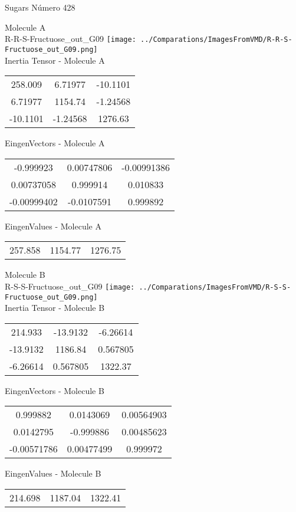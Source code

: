 \vtab[-2cm]
\begin{center}
{\large Sugars \tab Número 428}
\end{center}
\begin{multicols}{2}
\begin{center}

Molecule A \\ 
R-R-S-Fructuose\_out\_G09
\texttt{[image: ../Comparations/ImagesFromVMD/R-R-S-Fructuose\_out\_G09.png]}
\\
Inertia Tensor - Molecule A \\
\vtab

\begin{tabular}{|c c c|}
258.009	 & 	6.71977	 & 	-10.1101	 \\
6.71977	 & 	1154.74	 & 	-1.24568	 \\
-10.1101	 & 	-1.24568	 & 	1276.63
\end{tabular}

\vtab
 EingenVectors - Molecule A     \\
\vtab
\begin{tabular}{|c c c|}
-0.999923	 & 	0.00747806	 & 	-0.00991386	 \\
0.00737058	 & 	0.999914	 & 	0.010833	 \\
-0.00999402	 & 	-0.0107591	 & 	0.999892
\end{tabular}

\vtab
 EingenValues - Molecule A     \\
\vtab
\begin{tabular}{|c c c|}
257.858	 & 	1154.77	 & 	1276.75	 \\
\end{tabular}
\columnbreak

Molecule B \\ 
R-S-S-Fructuose\_out\_G09
\texttt{[image: ../Comparations/ImagesFromVMD/R-S-S-Fructuose\_out\_G09.png]}
\\
Inertia Tensor - Molecule B \\
\vtab

\begin{tabular}{|c c c|}
214.933	 & 	-13.9132	 & 	-6.26614	 \\
-13.9132	 & 	1186.84	 & 	0.567805	 \\
-6.26614	 & 	0.567805	 & 	1322.37
\end{tabular}

\vtab
 EingenVectors - Molecule B     \\
\vtab
\begin{tabular}{|c c c|}
0.999882	 & 	0.0143069	 & 	0.00564903	 \\
0.0142795	 & 	-0.999886	 & 	0.00485623	 \\
-0.00571786	 & 	0.00477499	 & 	0.999972
\end{tabular}

\vtab
 EingenValues - Molecule B     \\
\vtab
\begin{tabular}{|c c c|}
214.698	 & 	1187.04	 & 	1322.41	 \\
\end{tabular}

\end{center}
\end{multicols}
